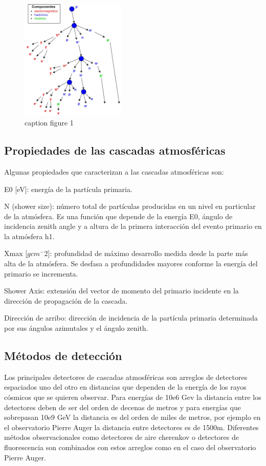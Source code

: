 \begin{figure}
    \centering
    \includegraphics[width=50mm,scale=0.5]{Figures/showercomponents-jpg.jpg}
    \decoRule
    \caption[logitudinaldist]{caption figure 1}
    \label{fig:logitudinaldist}
\end{figure}

\subsection{Propiedades de las cascadas atmosféricas}

Algunas propiedades que caracterizan a las cascadas atmosféricas son:

E0 [eV]: energía de la partícula primaria. 

N (shower size): número total de partículas producidas en un nivel en particular de la atmósfera. Es una función que depende de la energía E0, ángulo de incidencia zenith angle y a altura de la primera interacción del evento primario en la atmósfera h1.
 
Xmax [$gcm^-2$]: profundidad de máximo desarrollo medida desde la parte más alta de la atmósfera. Se desfasa a profundidades mayores conforme la energía del primario se incrementa.

Shower Axis: extensión del vector de momento del primario incidente en la dirección de propagación de la cascada.

Dirección de arribo: dirección de incidencia de la partícula primaria determinada por sus ángulos azimutales y el ángulo zenith.

\subsection{Métodos de detección}

Los principales detectores de cascadas atmosféricas son arreglos de detectores espaciados uno del otro en distancias que dependen de la energía de los rayos cósmicos que se quieren observar. Para energías de 10e6 Gev la distancia entre los detectores deben de ser del orden de decenas de metros y para energías que sobrepasan 10e9 GeV la distancia es del orden de miles de metros, por ejemplo en el observatorio Pierre Auger la distancia entre detectores es de 1500m. Diferentes métodos observacionales como detectores de aire cherenkov o detectores de fluorescencia son combinados con estos arreglos como en el caso del observatorio Pierre Auger.

